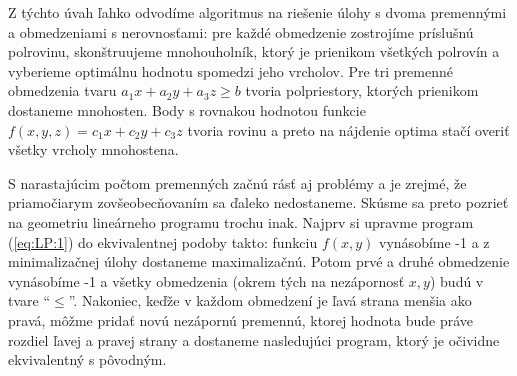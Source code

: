 \noindent
\begin{minipage}[t]{\textwidth-6cm}
\vspace{0pt}
Z týchto úvah ľahko odvodíme algoritmus na riešenie úlohy s dvoma premennými a
obmedzeniami s nerovnosťami: pre každé obmedzenie zostrojíme príslušnú
polrovinu, skonštruujeme mnohouholník, ktorý je prienikom všetkých polrovín a
vyberieme optimálnu hodnotu spomedzi jeho vrcholov.  Pre tri premenné
obmedzenia tvaru $a_1x+a_2y+a_3z\ge b$ tvoria polpriestory, ktorých prienikom
dostaneme mnohosten. Body s rovnakou hodnotou funkcie $f(x,y,z)=c_1x+c_2y+c_3z$
tvoria rovinu a preto na nájdenie optima stačí overiť všetky vrcholy
mnohostena.\\
\end{minipage}
\begin{minipage}[t]{6cm}
  \vspace{0pt}
  
\end{minipage}


\noindent S narastajúcim počtom premenných začnú rásť aj problémy a je zrejmé,
že priamočiarym zovšeobecňovaním sa ďaleko nedostaneme. Skúsme sa preto pozrieť
na geometriu lineárneho programu trochu inak.  Najprv si upravme program
(\ref{eq:LP:1}) do ekvivalentnej podoby takto: funkciu $f(x,y)$ vynásobíme -1 a
z minimalizačnej úlohy dostaneme maximalizačnú. Potom prvé a druhé obmedzenie
vynásobíme -1 a všetky obmedzenia (okrem tých na nezápornosť $x,y$) budú v
tvare ``$\le$''. Nakoniec, keďže v každom obmedzení je ľavá strana menšia ako
pravá, môžme pridať novú nezápornú premennú, ktorej hodnota bude práve rozdiel
ľavej a pravej strany a dostaneme nasledujúci program, ktorý je očividne
ekvivalentný s pôvodným.


